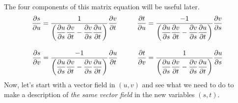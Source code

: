 \documentclass[fleqn,letterpaper]{report}
\begin{document}
The four components of this matrix equation will be useful
later. 
\begin{align*}
\dfrac{\partial s}{\partial u} & = 
\frac{1}{ \left( \dfrac{\partial u}{\partial s} \dfrac{\partial v}{\partial t} - 
\dfrac{\partial v}{\partial s} \dfrac{\partial u}{\partial t} \right) }
\dfrac{\partial v}{\partial t} \hspace{1cm}
\dfrac{\partial t}{\partial u} = 
\frac{-1}{ \left( \dfrac{\partial u}{\partial s} \dfrac{\partial v}{\partial t} - 
\dfrac{\partial v}{\partial s} \dfrac{\partial u}{\partial t} \right) }
\dfrac{\partial v}{\partial s} \\[1em]
\dfrac{\partial s}{\partial v} & = 
\frac{-1}{ \left( \dfrac{\partial u}{\partial s} \dfrac{\partial v}{\partial t} - 
\dfrac{\partial v}{\partial s} \dfrac{\partial u}{\partial t} \right) }
\dfrac{\partial u}{\partial t} \hspace{1cm}
\dfrac{\partial t}{\partial v} = 
\frac{1}{ \left( \dfrac{\partial u}{\partial s} \dfrac{\partial v}{\partial t} - 
\dfrac{\partial v}{\partial s} \dfrac{\partial u}{\partial t} \right) }
\dfrac{\partial u}{\partial s} 
\end{align*}
Now, let's start with a vector field in $(u,v)$ and
see what we need to do to make a description of \emph{the same
vector field} in the new variables $(s,t)$.
\end{document}
